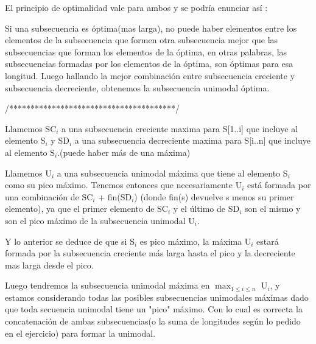 El principio de optimalidad vale para ambos y se podría enunciar así : 

Si una subsecuencia es óptima(mas larga), no puede haber elementos entre los elementos de la subsecuencia que formen otra subsecuencia mejor que las subsecuencias que forman los elementos de la óptima, en otras palabras, las subsecuencias formadas por los elementos de la óptima, son óptimas para esa longitud.
Luego hallando la mejor combinación entre subsecuencia creciente y subsecuencia decreciente, obtenemos la subsecuencia unimodal óptima. 

/***************************************/


Llamemos SC${_i}$ a una subsecuencia creciente maxima para S[1..i] que incluye al elemento S$_i$ y SD${_i}$ a una subsecuencia decreciente maxima para S[i..n] que incluye al elemento S${_i}$.(puede haber más de una máxima)

Llamemos U${_i}$ a una subsecuencia unimodal máxima que tiene al elemento S${_i}$ como su pico máximo.
Tenemos entonces que necesariamente U${_i}$ está formada por una combinación de SC${_i}$ + fin(SD${_i}$) (donde fin(s) devuelve s menos su primer elemento), ya que el primer elemento de SC${_i}$ y el último de SD${_i}$ son el mismo y son el pico máximo de la subsecuencia unimodal U${_i}$.

Y lo anterior se deduce de que si S{$_i$} es pico máximo, la máxima U${_i}$ estará formada por la subsecuencia creciente más larga hasta el pico y la decreciente mas larga desde el pico. 

Luego tendremos la subsecuencia unimodal máxima en $\max_{1\leq i\leq n}$ U${_i}$, y estamos considerando todas las posibles subsecuencias unimodales máximas dado que toda secuencia unimodal tiene un "pico" máximo.
Con lo cual es correcta la concatenación de ambas subsecuencias(o la suma de longitudes según lo pedido en el ejercicio) para formar la unimodal. 
